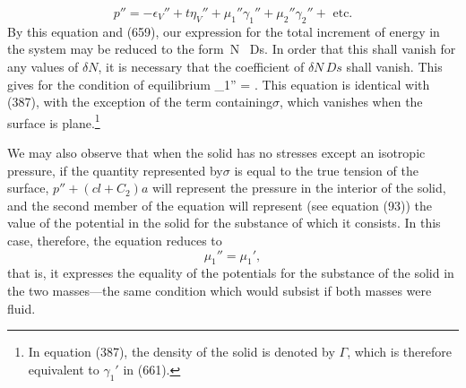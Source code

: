 \documentclass[12pt]{article}
\newcommand{\dd}{\delta}
\begin{document}
$$ p''= - \epsilon_V'' + t\eta_V'' + \mu_1''\gamma_1'' + \mu_2''\gamma_2'' + \text{ etc.} $$
By this equation and (659), our expression for the total increment of energy in the system may be reduced to the form
\eqs \int{} \,\dd N \, Ds.  \label{660}\eqe
In order that this shall vanish for any values of $\dd N$, it is necessary that the coefficient of $\dd N \, Ds$ shall vanish. This gives for the condition of equilibrium
\eqs \mu_1'' =   . \label{661}\eqe
This equation is identical with (387), with the exception of the term containing$\sigma$, which vanishes when the surface is plane.\footnote{In equation (387), the density of the solid is denoted by $\Gamma$, which is therefore equivalent to $\gamma_1'$ in (661).}

We may also observe that when the solid has no stresses except an isotropic pressure, if the quantity represented by$\sigma$ is equal to the true tension of the surface, $p''+(cl+C_2)a$ will represent the pressure in the interior of the solid, and the second member of the equation will represent (see equation (93)) the value of the potential in the solid for the substance of which it consists. In this case, therefore, the
equation reduces to
$$\mu_1''=\mu_1',$$
that is, it expresses the equality of the potentials for the substance of the solid in the two masses---the same condition which would subsist if both masses were fluid.
\end{document}
